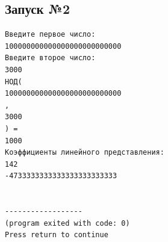 \documentclass[a4paper,12pt]{article} %
\begin{document}
\subsection*{Запуск №2}
\begin{verbatim}
Введите первое число:
100000000000000000000000000
Введите второе число:
3000
НОД(
100000000000000000000000000
,
3000
) =
1000
Коэффициенты линейного представления:
142
-4733333333333333333333333


------------------
(program exited with code: 0)
Press return to continue
\end{verbatim}

\printbibliography
\end{document}
